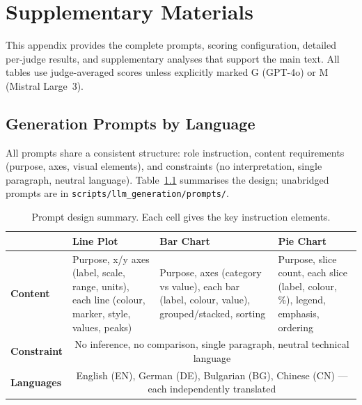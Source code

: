 \appendix

\chapter{Supplementary Materials}
\label{app:supplementary}

This appendix provides the complete prompts, scoring configuration, detailed per-judge results, and supplementary analyses that support the main text. All tables use judge-averaged scores unless explicitly marked G (GPT-4o) or M (Mistral Large~3).

\section{Generation Prompts by Language}
\label{app:prompts}

All prompts share a consistent structure: role instruction, content requirements (purpose, axes, visual elements), and constraints (no interpretation, single paragraph, neutral language). Table~\ref{tab:prompt-summary} summarises the design; unabridged prompts are in \texttt{scripts/llm\_generation/prompts/}.

\vspace{-4pt}
\begin{table}[H]
\centering
\scriptsize
\caption{Prompt design summary. Each cell gives the key instruction elements.}\label{tab:prompt-summary}
\setlength{\tabcolsep}{3pt}
\begin{tabular}{@{}l p{3.5cm} p{3.5cm} p{3.5cm}@{}}
\toprule
 & \textbf{Line Plot} & \textbf{Bar Chart} & \textbf{Pie Chart} \\
\midrule
\textbf{Content} & Purpose, x/y axes (label, scale, range, units), each line (colour, marker, style, values, peaks) & Purpose, axes (category vs value), each bar (label, colour, value), grouped/stacked, sorting & Purpose, slice count, each slice (label, colour, \%), legend, emphasis, ordering \\
\midrule
\textbf{Constraint} & \multicolumn{3}{c}{No inference, no comparison, single paragraph, neutral technical language} \\
\midrule
\textbf{Languages} & \multicolumn{3}{c}{English (EN), German (DE), Bulgarian (BG), Chinese (CN) --- each independently translated} \\
\bottomrule
\end{tabular}
\end{table}

